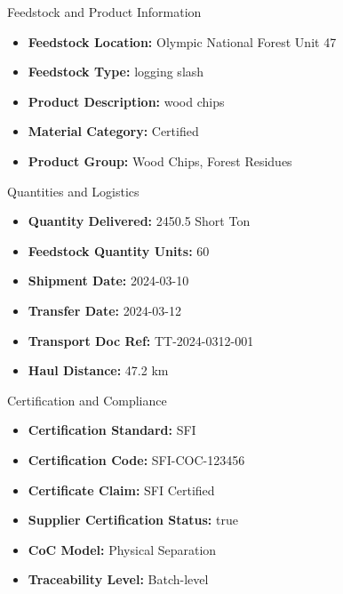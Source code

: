 \documentclass{beamer}
\begin{document}
\begin{frame}{Feedstock and Product Information}
\begin{itemize}
  \item \textbf{Feedstock Location:} Olympic National Forest Unit 47
  \item \textbf{Feedstock Type:} logging slash
  \item \textbf{Product Description:} wood chips
  \item \textbf{Material Category:} Certified
  \item \textbf{Product Group:} Wood Chips, Forest Residues
\end{itemize}
\end{frame}

\begin{frame}{Quantities and Logistics}
\begin{itemize}
  \item \textbf{Quantity Delivered:} 2450.5 Short Ton
  \item \textbf{Feedstock Quantity Units:} 60
  \item \textbf{Shipment Date:} 2024-03-10
  \item \textbf{Transfer Date:} 2024-03-12
  \item \textbf{Transport Doc Ref:} TT-2024-0312-001
  \item \textbf{Haul Distance:} 47.2 km
\end{itemize}
\end{frame}

\begin{frame}{Certification and Compliance}
\begin{itemize}
  \item \textbf{Certification Standard:} SFI
  \item \textbf{Certification Code:} SFI-COC-123456
  \item \textbf{Certificate Claim:} SFI Certified
  \item \textbf{Supplier Certification Status:} true
  \item \textbf{CoC Model:} Physical Separation
  \item \textbf{Traceability Level:} Batch-level
\end{itemize}
\end{frame}
\end{document}
